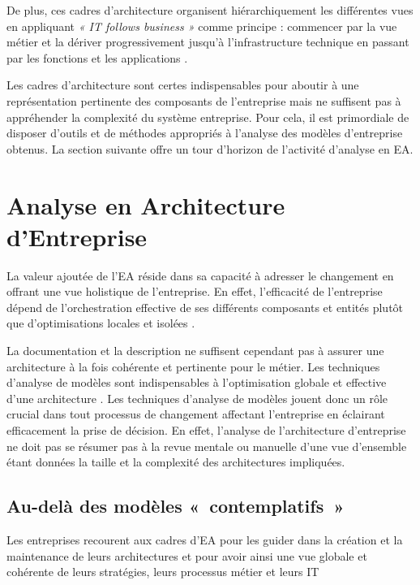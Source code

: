 De plus, ces cadres d'architecture organisent hiérarchiquement les différentes vues en
appliquant \emph{« IT follows business »} comme principe : commencer par la
vue métier et la dériver progressivement jusqu'à l'infrastructure
technique en passant par les fonctions et les applications
\cite{winter2006essential}. 

Les cadres d'architecture sont certes indispensables pour aboutir à une représentation pertinente des composants de l'entreprise mais ne suffisent pas à appréhender la complexité du système entreprise. Pour cela, il est primordiale de disposer d'outils et de méthodes appropriés à l'analyse des modèles d'entreprise obtenus. La section suivante offre un tour d'horizon de l'activité d'analyse en EA. 

\section{Analyse en Architecture d'Entreprise}

La valeur ajoutée de l'EA réside dans sa capacité à adresser le changement en
offrant une vue holistique de l'entreprise. En effet, l'efficacité de
l'entreprise dépend de l'orchestration effective de ses différents composants
et entités plutôt que d'optimisations locales et isolées
\cite{nadler1992organizational}. 

La documentation et la description ne suffisent cependant pas à assurer une
architecture à la fois cohérente et pertinente pour le métier. Les techniques
d'analyse de modèles sont indispensables à l'optimisation globale et effective
d'une architecture \cite{lankhorst2013enterprise}. Les techniques d'analyse de
modèles jouent donc un rôle crucial dans tout processus de changement affectant
l'entreprise en éclairant efficacement la prise de décision. En effet,
l'analyse de l'architecture d'entreprise ne doit pas se résumer pas à la revue
mentale ou manuelle d'une vue d'ensemble étant données la taille et la
complexité des architectures impliquées.

\subsection{Au-delà des modèles «~contemplatifs~»}
\label{sec:EA_contemplatif}
Les entreprises recourent aux cadres d'EA pour les guider dans la création et
la maintenance de leurs architectures et pour avoir ainsi une vue globale et
cohérente de leurs stratégies, leurs processus métier et leurs IT 

